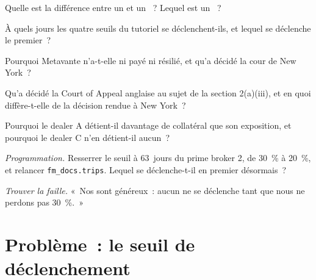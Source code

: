 \begin{exercise}[$\star$]\label{exo:fm:legal-documentation:2}
Quelle est la différence entre un  et un ~? Lequel est un ~?
\end{exercise}

\begin{exercise}[$\star$]\label{exo:fm:legal-documentation:3}
À quels jours les quatre seuils du tutoriel se déclenchent-ils, et lequel se déclenche le premier~?
\end{exercise}

\begin{exercise}[$\star\star$]\label{exo:fm:legal-documentation:4}
Pourquoi Metavante n'a-t-elle ni payé ni résilié, et qu'a décidé la cour de New York~?
\end{exercise}

\begin{exercise}[$\star\star$]\label{exo:fm:legal-documentation:5}
Qu'a décidé la Court of Appeal anglaise au sujet de la section 2(a)(iii), et en quoi diffère-t-elle de la décision rendue à New York~?
\end{exercise}

\begin{exercise}[$\star\star$]\label{exo:fm:legal-documentation:6}
Pourquoi le dealer A détient-il davantage de collatéral que son exposition, et pourquoi le dealer C n'en détient-il aucun~?
\end{exercise}

\begin{exercise}[$\star\star\star$]\label{exo:fm:legal-documentation:7}
\emph{Programmation.} Resserrer le seuil à 63~jours du prime broker 2, de 30~\% à 20~\%, et relancer \texttt{fm\_docs.trips}. Lequel se déclenche-t-il en premier désormais~?
\end{exercise}

\begin{exercise}[$\star\star\star$]\label{exo:fm:legal-documentation:8}
\emph{Trouver la faille.} «~Nos  sont généreux~: aucun ne se déclenche tant que nous ne perdons pas 30~\%.~»
\end{exercise}

\section{Problème~: le seuil de déclenchement}

